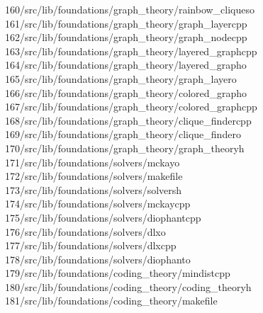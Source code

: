 \begin{tabbing}
160\>/src/lib/foundations/graph\_theory/rainbow\_cliqueso\\[0pt]
161\>/src/lib/foundations/graph\_theory/graph\_layercpp\\[0pt]
162\>/src/lib/foundations/graph\_theory/graph\_nodecpp\\[0pt]
163\>/src/lib/foundations/graph\_theory/layered\_graphcpp\\[0pt]
164\>/src/lib/foundations/graph\_theory/layered\_grapho\\[0pt]
165\>/src/lib/foundations/graph\_theory/graph\_layero\\[0pt]
166\>/src/lib/foundations/graph\_theory/colored\_grapho\\[0pt]
167\>/src/lib/foundations/graph\_theory/colored\_graphcpp\\[0pt]
168\>/src/lib/foundations/graph\_theory/clique\_findercpp\\[0pt]
169\>/src/lib/foundations/graph\_theory/clique\_findero\\[0pt]
170\>/src/lib/foundations/graph\_theory/graph\_theoryh\\[0pt]
171\>/src/lib/foundations/solvers/mckayo\\[0pt]
172\>/src/lib/foundations/solvers/makefile\\[0pt]
173\>/src/lib/foundations/solvers/solversh\\[0pt]
174\>/src/lib/foundations/solvers/mckaycpp\\[0pt]
175\>/src/lib/foundations/solvers/diophantcpp\\[0pt]
176\>/src/lib/foundations/solvers/dlxo\\[0pt]
177\>/src/lib/foundations/solvers/dlxcpp\\[0pt]
178\>/src/lib/foundations/solvers/diophanto\\[0pt]
179\>/src/lib/foundations/coding\_theory/mindistcpp\\[0pt]
180\>/src/lib/foundations/coding\_theory/coding\_theoryh\\[0pt]
181\>/src/lib/foundations/coding\_theory/makefile\\[0pt]

\end{tabbing}
